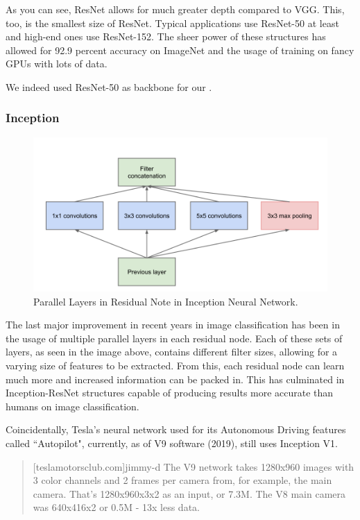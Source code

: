 As you can see, ResNet allows for much greater depth compared to VGG. This, too, is the smallest size of ResNet. Typical applications use ResNet-50 at least and high-end ones use ResNet-152. The sheer power of these structures has allowed for 92.9 percent accuracy on ImageNet and the usage of training on fancy GPUs with lots of data.

We indeed used ResNet-50 as backbone for our \maskrcnn.


\subsubsection{Inception}\label{s:imagenet-inception}
\begin{figure}[H]
	\centering
	\includegraphics[scale=0.5]{images/inception}
	\caption{Parallel Layers in Residual Note in Inception Neural Network.}
	\label{f:imagenet-inception}
\end{figure}

The last major improvement in recent years in image classification has been in the usage of multiple parallel layers in each residual node. Each of these sets of layers, as seen in the image above, contains different filter sizes, allowing for a varying size of features to be extracted. From this, each residual node can learn much more and increased information can be packed in. This has culminated in Inception-ResNet structures capable of producing results more accurate than humans on image classification.

Coincidentally, Tesla's neural network used for its Autonomous Driving features called “Autopilot", currently, as of V9 software (2019), still uses Inception V1.
\begin{quote}[teslamotorsclub.com]{jimmy-d}
	The V9 network takes 1280x960 images with 3 color channels and 2 frames per camera from, for example, the main camera. That’s 1280x960x3x2 as an input, or 7.3M. The V8 main camera was 640x416x2 or 0.5M - 13x less data.
\end{quote}

